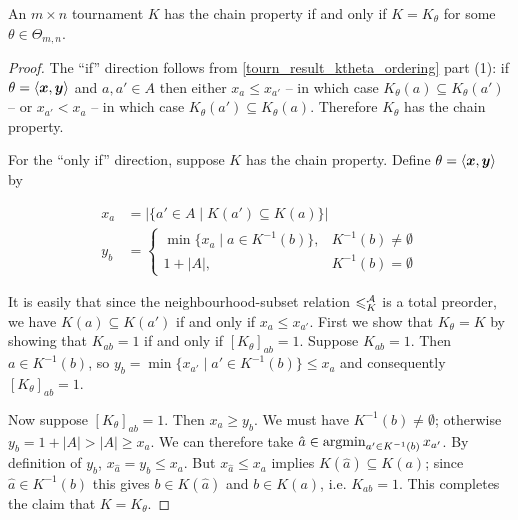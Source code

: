 \begin{lemma}
   \label{tourn_result_chain_iff_ktheta}

   An $m \times n$ tournament $K$ has the chain property if and only if $K =
   K_\theta$ for some $\theta \in \Theta_{m,n}$.

\end{lemma}

\begin{proof}
    The ``if'' direction follows from \cref{tourn_result_ktheta_ordering} part (1):
    if $\theta = \langle {\bm{x}, \bm{y}} \rangle$ and $a, a' \in A$ then
    either $x_a \le x_{a'}$ -- in which case $K_\theta(a)
    \subseteq K_\theta(a')$ -- or $x_{a'} < x_a$ -- in
    which case $K_\theta(a') \subseteq K_\theta(a)$. Therefore $K_\theta$ has
    the chain property.

    For the ``only if'' direction, suppose $K$ has the chain property.
    Define $\theta = \langle {\bm{x}, \bm{y}} \rangle$ by

    \[
       \begin{aligned}
           x_a &= |\{a' \in A \mid K(a') \subseteq K(a)\}| \\
           y_b &= \begin{cases}
              \min\{x_a \mid a \in K^{-1}(b)\}
                  ,& K^{-1}(b) \ne \emptyset \\
              1 + |A|,& K^{-1}(b) = \emptyset
           \end{cases}
       \end{aligned}
    \]

    It is easily that since the neighbourhood-subset relation ${\leqslant^{\mathcal{A}}_K}$ is a
    total preorder, we have $K(a) \subseteq K(a')$ if and only if $x_a \le
    x_{a'}$.  First we show that $K_\theta = K$ by showing that $K_{ab} = 1$ if
    and only if $[K_\theta]_{ab} = 1$. Suppose $K_{ab} = 1$. Then $a \in
    K^{-1}(b)$, so $y_b = \min\{x_{a'} \mid a' \in K^{-1}(b)\} \le x_a$ and
    consequently $[K_\theta]_{ab} = 1$.

    Now suppose $[K_\theta]_{ab} = 1$. Then $x_a \ge y_b$.  We must have
    $K^{-1}(b) \ne \emptyset$; otherwise $y_b = 1 + |A|
    > |A| \ge x_a$. We can therefore take $\hat{a} \in \operatorname{argmin}_{a'
    \in K^{-1}(b)}{x_{a'}}$. By definition of $y_b$, $x_{\hat{a}} = y_b \le
    x_a$. But $x_{\hat{a}} \le x_a$ implies $K(\hat{a}) \subseteq K(a)$; since
    $\hat{a} \in K^{-1}(b)$ this gives $b \in K(\hat{a})$ and $b \in K(a)$,
    i.e. $K_{ab} = 1$. This completes the claim that $K = K_\theta$.


\end{proof}
